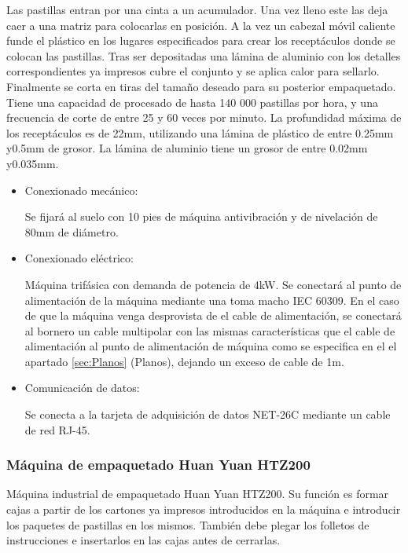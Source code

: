 	

	Las pastillas entran por una cinta a un acumulador. Una vez lleno este las deja caer a una matriz para colocarlas en posición. A la vez un cabezal móvil caliente funde el plástico en los lugares especificados para crear los receptáculos donde se colocan las pastillas. Tras ser depositadas una lámina de aluminio con los detalles correspondientes ya impresos cubre el conjunto y se aplica calor para sellarlo. Finalmente se corta en tiras del tamaño deseado para su posterior empaquetado. Tiene una capacidad de procesado de hasta 140 000 pastillas por hora, y una frecuencia de corte de entre 25 y 60 veces por minuto. La profundidad máxima de los receptáculos es de 22mm, utilizando una lámina de plástico de entre 0.25mm y0.5mm de grosor. La lámina de aluminio tiene un grosor de entre 0.02mm y0.035mm.


		\begin{itemize}
				\item{Conexionado mecánico:}
				
				Se fijará al suelo con 10 pies de máquina antivibración y de nivelación de 80mm de diámetro.

				\item{Conexionado eléctrico:}

				Máquina trifásica con demanda de potencia de 4kW. Se conectará al punto de alimentación de la máquina mediante una  toma macho IEC 60309. En el caso de que la máquina venga desprovista de el cable de alimentación, se conectará al bornero un cable multipolar con las mismas características que el cable de alimentación al punto de alimentación de máquina como se especifica en el el apartado \ref{sec:Planos} (Planos), dejando un exceso de cable de 1m. \
				
				\item{Comunicación de datos:}

				Se conecta a la tarjeta de adquisición de datos NET-26C mediante un cable de red RJ-45.
		\end{itemize}
	
	\newpage

	\subsubsection{Máquina de empaquetado Huan Yuan HTZ200}

	

	Máquina industrial de empaquetado Huan Yuan HTZ200. Su función es formar cajas a partir de los cartones ya impresos introducidos en la máquina e introducir los paquetes de pastillas en los mismos. También debe plegar los folletos de instrucciones e insertarlos en las cajas antes de cerrarlas. \\


